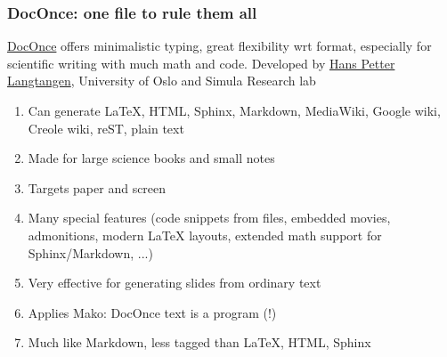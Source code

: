 \documentclass{beamer}
\newcounter{doconce:movie:counter}
\begin{document}
\begin{frame}
\frametitle{DocOnce: one file to rule them all}

\begin{block}{}

\href{{http://hplgit.github.io/doconce/doc/web/index.html}}{DocOnce} offers minimalistic typing, great flexibility wrt format, especially for scientific writing with much math and code. Developed by \href{{http://hplgit.github.io/homepage/index.html}}{Hans Petter Langtangen}, University of Oslo and Simula Research lab

\begin{enumerate}
\item Can generate {\LaTeX}, HTML, Sphinx, Markdown, MediaWiki, Google wiki, Creole wiki, reST, plain text

\item Made for large science books and small notes

\item Targets paper and screen

\item Many special features (code snippets from files, embedded movies, admonitions, modern {\LaTeX} layouts, extended math support for Sphinx/Markdown, ...)

\item Very effective for generating slides from ordinary text

\item Applies Mako: DocOnce text is a program (!)

\item Much like Markdown, less tagged than {\LaTeX}, HTML, Sphinx
\end{enumerate}

\noindent
\end{block}
\end{frame}
\end{document}
